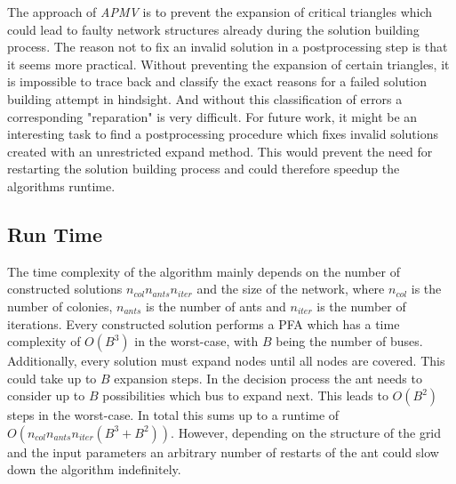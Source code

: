 The approach of \textit{APMV} is to prevent the expansion of critical triangles which could lead to faulty network structures already during the solution building process. The reason not to fix an invalid solution in a postprocessing step is that it seems more practical. Without preventing the expansion of certain triangles, it is impossible to trace back and classify the exact reasons for a failed solution building attempt in hindsight. And without this classification of errors a corresponding "reparation" is very difficult. For future work, it might be an interesting task to find a postprocessing procedure which fixes invalid solutions created with an unrestricted expand method. This would prevent the need for restarting the solution building process and could therefore speedup the algorithms runtime.

\subsection{Run Time}
The time complexity of the algorithm mainly depends on the number of constructed solutions $n_{col} n_{ants} n_{iter}$ and the size of the network, where $n_{col}$ is the number of colonies, $n_{ants}$ is the number of ants and $n_{iter}$ is the number of iterations. Every constructed solution performs a PFA which has a time complexity of $O(B^3)$ in the worst-case, with $B$ being the number of buses. Additionally, every solution must expand nodes until all nodes are covered. This could take up to $B$ expansion steps. In the decision process the ant needs to consider up to $B$ possibilities which bus to expand next. This leads to $O(B^2)$ steps in the worst-case. In total this sums up to a runtime of $O(n_{col} n_{ants} n_{iter} (B^3+B^2))$. However, depending on the structure of the grid and the input parameters an arbitrary number of restarts of the ant could slow down the algorithm indefinitely.




